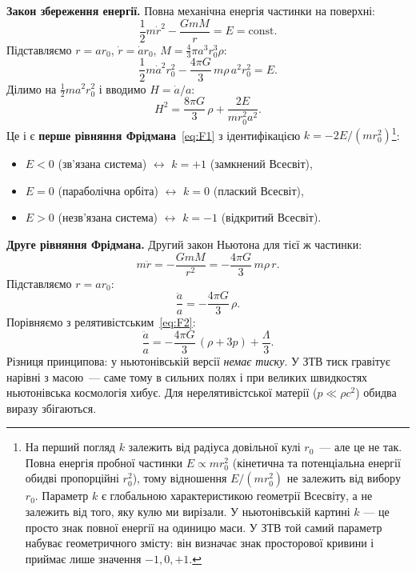 

\textbf{Закон збереження енергії.}
Повна механічна енергія частинки на поверхні:
\[
  \frac{1}{2}m\dot{r}^2 - \frac{GmM}{r} = E = \text{const}.
\]
Підставляємо $r = a r_0$, $\dot{r} = \dot{a} r_0$,
$M = \frac{4}{3}\pi a^3 r_0^3 \rho$:
\[
  \frac{1}{2}m\dot{a}^2 r_0^2 - \frac{4\pi G}{3}\,m\rho\,a^2 r_0^2 = E.
\]
Ділимо на $\frac{1}{2}m a^2 r_0^2$ і вводимо $H = \dot{a}/a$:
\begin{equation}\label{eq:newton_friedmann}
  \boxed{H^2 = \frac{8\pi G}{3}\,\rho + \frac{2E}{m r_0^2 a^2}.}
\end{equation}
Це і є \textbf{перше рівняння Фрідмана}~\eqref{eq:F1}
з ідентифікацією $k = -2E/(m r_0^2)$\footnote{%
На перший погляд $k$ залежить від радіуса довільної
кулі $r_0$~--- але це не так. Повна енергія пробної
частинки $E \propto m r_0^2$ (кінетична та потенціальна
енергії обидві пропорційні $r_0^2$), тому відношення
$E/(m r_0^2)$ не залежить від вибору $r_0$. Параметр
$k$ є глобальною характеристикою геометрії Всесвіту,
а не залежить від того, яку кулю ми вирізали.
У ньютонівській картині $k$ --- це просто знак повної
енергії на одиницю маси. У ЗТВ той самий параметр
набуває геометричного змісту: він визначає знак
просторової кривини і приймає лише значення $-1, 0, +1$.
}:
\begin{itemize}
  \item $E < 0$ (зв'язана система) $\leftrightarrow$ $k = +1$ (замкнений Всесвіт),
  \item $E = 0$ (параболічна орбіта) $\leftrightarrow$ $k = 0$ (плаский Всесвіт),
  \item $E > 0$ (незв'язана система) $\leftrightarrow$ $k = -1$ (відкритий Всесвіт).
\end{itemize}

\textbf{Друге рівняння Фрідмана.}
Другий закон Ньютона для тієї ж частинки:
\[
  m\ddot{r} = -\frac{GmM}{r^2} = -\frac{4\pi G}{3}\,m\rho\,r.
\]
Підставляємо $r = ar_0$:
\begin{equation}\label{eq:newton_acceleration}
  \frac{\ddot{a}}{a} = -\frac{4\pi G}{3}\,\rho.
\end{equation}
Порівняємо з релятивістським~\eqref{eq:F2}:
\[
  \frac{\ddot{a}}{a} = -\frac{4\pi G}{3}\,(\rho + 3p) + \frac{\Lambda}{3}.
\]
Різниця принципова: у ньютонівській версії \emph{немає тиску}.
У ЗТВ тиск гравітує нарівні з масою~--- саме тому
в сильних полях і при великих швидкостях ньютонівська
космологія хибує. Для нерелятивістської матерії
($p \ll \rho c^2$) обидва виразу збігаються.

